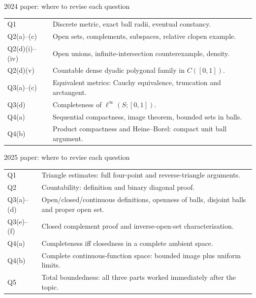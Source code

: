 \begin{note}{2024 paper: where to revise each question}
\begin{tabular}{p{.18\linewidth}p{.73\linewidth}}
Q1 & Discrete metric, exact ball radii, eventual constancy.\\[3pt]
Q2(a)--(c) & Open sets, complements, subspaces, relative clopen example.\\[3pt]
Q2(d)(i)--(iv) & Open unions, infinite-intersection counterexample, density.\\[3pt]
Q2(d)(v) & Countable dense dyadic polygonal family in $C([0,1])$.\\[3pt]
Q3(a)--(c) & Equivalent metrics: Cauchy equivalence, truncation and arctangent.\\[3pt]
Q3(d) & Completeness of $\ell^\infty(S;[0,1])$.\\[3pt]
Q4(a) & Sequential compactness, image theorem, bounded sets in balls.\\[3pt]
Q4(b) & Product compactness and Heine--Borel: compact unit ball argument.
\end{tabular}
\end{note}
\begin{note}{2025 paper: where to revise each question}
\begin{tabular}{p{.18\linewidth}p{.73\linewidth}}
Q1 & Triangle estimates: full four-point and reverse-triangle arguments.\\[3pt]
Q2 & Countability: definition and binary diagonal proof.\\[3pt]
Q3(a)--(d) & Open/closed/continuous definitions, openness of balls, disjoint balls and proper open set.\\[3pt]
Q3(e)--(f) & Closed complement proof and inverse-open-set characterisation.\\[3pt]
Q4(a) & Completeness iff closedness in a complete ambient space.\\[3pt]
Q4(b) & Complete continuous-function space: bounded image plus uniform limits.\\[3pt]
Q5 & Total boundedness: all three parts worked immediately after the topic.
\end{tabular}
\end{note}
